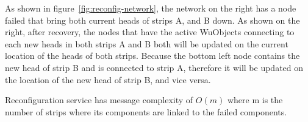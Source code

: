 As shown in figure~\ref{fig:reconfig-network}, the network on the right has
a node failed that bring both current heads of strips A, and B down. As shown
on the right, after recovery, the nodes that have the active WuObjects
connecting to each new heads in both strips A and B both will be updated on the
current location of the heads of both strips. Because the bottom left node
contains the new head of strip B and is connected to strip A, therefore it will
be updated on the location of the new head of strip B, and vice versa.

Reconfiguration service has message complexity of $O(m)$ where m is the
number of strips where its components are linked to the failed components.


